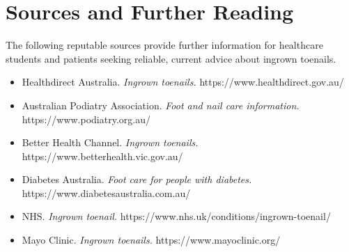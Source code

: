 \section*{Sources and Further Reading}
The following reputable sources provide further information for healthcare students and patients seeking reliable, current advice about ingrown toenails.
\begin{itemize}
    \item Healthdirect Australia. \textit{Ingrown toenails.} https://www.healthdirect.gov.au/
    \item Australian Podiatry Association. \textit{Foot and nail care information.} https://www.podiatry.org.au/
    \item Better Health Channel. \textit{Ingrown toenails.} https://www.betterhealth.vic.gov.au/
    \item Diabetes Australia. \textit{Foot care for people with diabetes.} https://www.diabetesaustralia.com.au/
    \item NHS. \textit{Ingrown toenail.} https://www.nhs.uk/conditions/ingrown-toenail/
    \item Mayo Clinic. \textit{Ingrown toenails.} https://www.mayoclinic.org/
\end{itemize}
